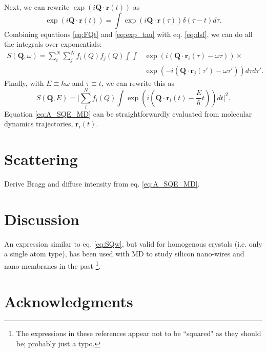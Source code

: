 \documentclass[11pt,prb,aps,nofootinbib,superscriptaddress,floatfix]{revtex4-2}
\begin{document}
Next, we can rewrite $\exp(i\bm{Q}\cdot\bm{r}(t))$ as
\begin{equation}
    \exp(i\bm{Q}\cdot\bm{r}(t))=\int \exp(i\bm{Q}\cdot\bm{r}(\tau)) \delta(\tau-t)d\tau.
    \label{eq:exp_tau}
\end{equation}
Combining equations \ref{eq:FQt} and \ref{eq:exp_tau} with eq. \ref{eq:dsf}, we can do all the integrals over exponentials:
\begin{equation}
    \begin{split}
    S(\bm{Q},\omega) = \sum_i^N \sum_j^N f_i(Q) f_j(Q) \int \int & \exp (i(\bm{Q}\cdot \bm{r}_i(\tau)-\omega\tau))  \times  \\
    & \exp (-i(\bm{Q}\cdot \bm{r}_j(\tau')-\omega\tau')) d\tau d\tau' .
    \end{split}
    \label{eq:SQw}
\end{equation}
Finally, with $E\equiv\hbar\omega$ and $\tau\equiv t$, we can rewrite this as
\begin{equation}
    S(\bm{Q},E) = \Big \lvert \sum_i^N f_i(Q)\int \exp \left(i \left( \bm{Q}\cdot \bm{r}_i(t)-\frac{E}{\hbar}t \right) \right)dt \Big \rvert^2.
    \label{eq:A_SQE_MD}
\end{equation}
Equation \ref{eq:A_SQE_MD} can be straightforwardly evaluated from molecular dynamics trajectories, $\bm{r}_i(t)$.

\section{Scattering}
{\color{red} Derive Bragg and diffuse intensity from eq. \ref{eq:A_SQE_MD}.}

\section{Discussion}
An expression similar to eq. \ref{eq:SQw}, but valid for homogenous crystals (i.e. only a single atom type), has been used with MD to study silicon nano-wires and nano-membranes in the past \cite{zushi2015effect,xiong2017native}\footnote{The expressions in these references appear not to be ``squared" as they should be; probably just a typo.}.


\section{Acknowledgments}




\end{document}
